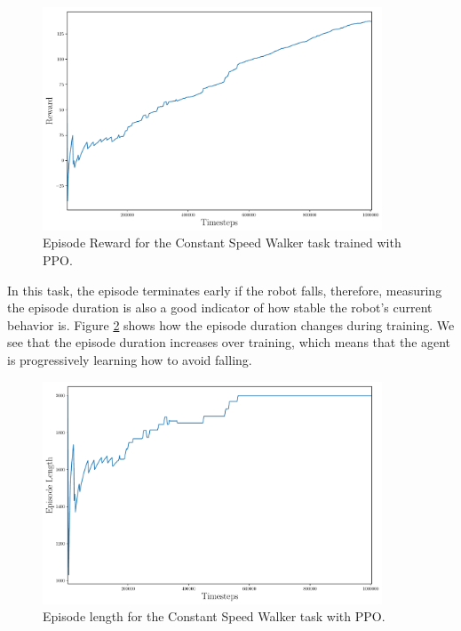 \begin{figure}[ht]
	\centering
	\includegraphics[width=0.9\textwidth]{Chapter7/ep_rew_walker.pdf}
	\caption{Episode Reward for the Constant Speed Walker task trained with PPO.}
	\label{fig:constant_episode_rew}
\end{figure}

In this task, the episode terminates early if the robot falls, therefore, measuring the episode duration
is also a good indicator of how stable the robot's current behavior is.
Figure \ref{fig:constant_episode_len} shows how the episode duration changes during training.
We see that the episode duration increases over training, which means that the agent is progressively
learning how to avoid falling.

\begin{figure}[ht]
	\centering
	\includegraphics[width=0.9\textwidth]{Chapter7/ep_len_walker.pdf}
	\caption{Episode length for the Constant Speed Walker task with PPO.}
	\label{fig:constant_episode_len}
\end{figure}

